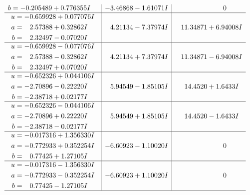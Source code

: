 \documentclass[1p]{elsarticle_modified}
\theoremstyle{definition}
\begin{document}
$$\begin{array}{c|c|c}
\begin{aligned}
b &= -0.205489 + 0.776355 I\end{aligned}
 & -3.46868 - 1.61071 I & \phantom{-0.000000 } 0 \\ \hline\begin{aligned}
u &= -0.659928 + 0.077076 I \\
a &= \phantom{-}2.57388 + 0.32862 I \\
b &= \phantom{-}2.32497 - 0.07020 I\end{aligned}
 & \phantom{-}4.21134 - 7.37974 I & \phantom{-}11.34871 + 6.94008 I \\ \hline\begin{aligned}
u &= -0.659928 - 0.077076 I \\
a &= \phantom{-}2.57388 - 0.32862 I \\
b &= \phantom{-}2.32497 + 0.07020 I\end{aligned}
 & \phantom{-}4.21134 + 7.37974 I & \phantom{-}11.34871 - 6.94008 I \\ \hline\begin{aligned}
u &= -0.652326 + 0.044106 I \\
a &= -2.70896 - 0.22220 I \\
b &= -2.38718 + 0.02177 I\end{aligned}
 & \phantom{-}5.94549 - 1.85105 I & \phantom{-}14.4520 + 1.6433 I \\ \hline\begin{aligned}
u &= -0.652326 - 0.044106 I \\
a &= -2.70896 + 0.22220 I \\
b &= -2.38718 - 0.02177 I\end{aligned}
 & \phantom{-}5.94549 + 1.85105 I & \phantom{-}14.4520 - 1.6433 I \\ \hline\begin{aligned}
u &= -0.017316 + 1.356330 I \\
a &= -0.772933 + 0.352254 I \\
b &= \phantom{-}0.77425 + 1.27105 I\end{aligned}
 & -6.60923 - 1.10020 I & \phantom{-0.000000 } 0 \\ \hline\begin{aligned}
u &= -0.017316 - 1.356330 I \\
a &= -0.772933 - 0.352254 I \\
b &= \phantom{-}0.77425 - 1.27105 I\end{aligned}
 & -6.60923 + 1.10020 I & \phantom{-0.000000 } 0\\
 \hline 
 \end{array}$$\newpage$$\begin{array}{c|c|c}  

\end{array}$$
\end{document}
